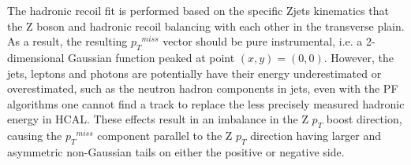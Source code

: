\vspace{0.3cm}
The hadronic recoil fit is performed based on the specific Zjets kinematics that the Z boson and hadronic recoil balancing with each other in the transverse plain.
As a result, the resulting ${p_{T}}^{miss}$ vector should be pure instrumental, i.e. a 2-dimensional Gaussian function peaked at point $(x,y)=(0,0)$. However, the jets, leptons and photons are potentially have their energy underestimated or overestimated, such as the neutron hadron components in jets, even with the PF algorithms one cannot find a 
track to replace the less precisely measured hadronic energy in HCAL. These effects result in an imbalance in the Z $p_T$ boost direction, causing the ${p_{T}}^{miss}$ component parallel
to the Z $p_T$ direction having larger and asymmetric non-Gaussian tails on either the positive or negative side. 


